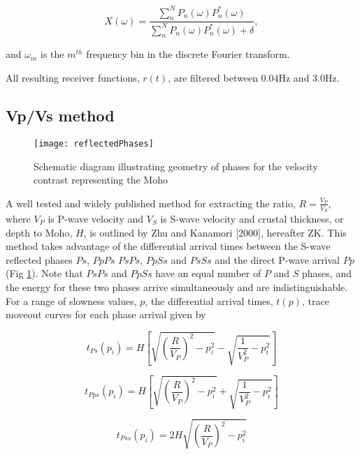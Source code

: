 \documentclass[draft, 12pt]{article}
\begin{document}
\begin{equation}
  X(\omega) = \frac {\sum_n^N P_n(\omega)P_n^*(\omega)} {\sum_n^N P_n(\omega)P_n^*(\omega) + \delta},
\end{equation}

and $\omega_m$ is the $m^{th}$ frequency bin in the discrete Fourier transform.

  All resulting receiver functions, $r(t)$, are filtered between 0.04Hz and 3.0Hz.



\subsection{Vp/Vs method} \label{section:VpVsMethod}

\begin{figure}
  \centering
    \texttt{[image: reflectedPhases]}
  \caption{Schematic diagram illustrating geometry of phases for the velocity contrast representing the Moho}
  \label{fig:reflectedPhases}
\end{figure}


  A well tested and widely published method for extracting the ratio, $R=\frac{V_P}{V_S}$, where $V_P$ is P-wave velocity and $V_S$ is S-wave velocity and crustal thickness, or depth to Moho, $H$, is outlined by Zhu and Kanamori [2000], hereafter ZK. This method takes advantage of the differential arrival times between the S-wave reflected phases $Ps$, $PpPs$ $PsPs$, $PpSs$ and $PsSs$ and the direct P-wave arrival $Pp$ (Fig \ref{fig:reflectedPhases}). Note that $PsPs$ and $PpSs$ have an equal number of $P$ and $S$ phases, and the energy for these two phases arrive simultaneously and are indistinguishable. For a range of slowness values, $p$, the differential arrival times, $t(p)$, trace moveout curves for each phase arrival given by

\begin{equation} \label{eq:tps}
t_{Ps}(p_i)=H \left[ \sqrt{ \left(\frac{R}{V_P}\right)^2 - p_i^2} - \sqrt{\frac{1}{V_P^2} - p_i^2} \right]
\end{equation}

\begin{equation}
t_{Pps}(p_i)=H \left[ \sqrt{ \left(\frac{R}{V_P}\right)^2 - p_i^2} + \sqrt{\frac{1}{V_P^2} - p_i^2} \right]
\end{equation}

\begin{equation}
t_{Pss}(p_i)= 2H  \sqrt{ \left(\frac{R}{V_P}\right)^2 - p_i^2}
\end{equation}
\end{document}

